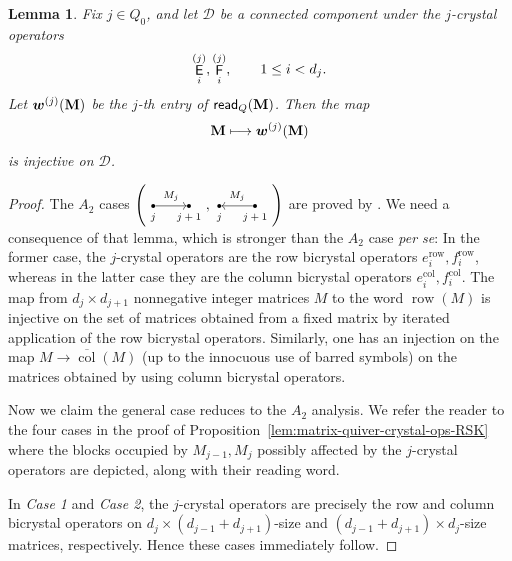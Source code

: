 \documentclass[12pt]{amsart}
\newcommand{\bs}{\boldsymbol}
\DeclareMathOperator{\mate}{\sf E}
\DeclareMathOperator{\matf}{\sf F}
\newtheorem{lemma}[theorem]{Lemma}
\theoremstyle{definition}
\theoremstyle{remark}
\begin{document}
\begin{lemma}\label{lem:single-vertex-injectivity}
Fix $j\in Q_0$, and let $\mathcal D$ be a connected component under
the $j$-crystal operators
\[\mate_i^{(j)},\matf_i^{(j)},\qquad 1\leq i<d_j.\]
Let ${\bs w}^{(j)}({\bf M})$ be the $j$-th entry of
${\sf read}_Q({\bf M})$. Then the map
\[{\bf M}\longmapsto {\bs w}^{(j)}({\bf M})\]
is injective on $\mathcal D$.
\end{lemma}
\begin{proof}
The $A_2$ cases $\left(
\begin{tikzpicture}[baseline=-0.5ex]
\node[circle,fill,inner sep=1pt,label=below:{\scriptsize $j$}] (a) at (0,0) {};
\node[circle,fill,inner sep=1pt,label=below:{\scriptsize $j+1$}]   (b) at (.9,0) {};
\draw[->] (a) -- node[above,font=\scriptsize] {$M_{j}$} (b);
\end{tikzpicture},
\begin{tikzpicture}[baseline=-0.5ex]
\node[circle,fill,inner sep=1pt,label=below:{\scriptsize $j$}] (a) at (0,0) {};
\node[circle,fill,inner sep=1pt,label=below:{\scriptsize $j+1$}]   (b) at (.9,0) {};
\draw[<-] (a) -- node[above,font=\scriptsize] {$M_{j}$} (b);
\end{tikzpicture}\right)$ are proved by \cite[Lemma~4.28]{AAA}. We need a consequence of that lemma, which is 
stronger than the $A_2$ case \emph{per se}:
In the former case, the 
$j$-crystal operators are the row bicrystal operators $e_i^{\operatorname{row}}, f_i^{\operatorname{row}}$, whereas in the
latter case they are the column bicrystal operators $e_i^{\operatorname{col}}, f_i^{\operatorname{col}}$. The
map from $d_j\times d_{j+1}$ nonnegative integer matrices $M$ to the word $\operatorname{row}(M)$
is injective on the set of matrices obtained from a fixed matrix by iterated application of the row bicrystal operators. Similarly, one has an 
injection on the map $M\to \overline{\operatorname{col}}(M)$ (up to the innocuous use of barred symbols) on the matrices obtained by using column bicrystal operators.

Now we claim the general case reduces to the $A_2$ analysis. We refer the reader to the four cases in the proof of Proposition~\ref{lem:matrix-quiver-crystal-ops-RSK} where the blocks occupied by $M_{j-1},M_j$ possibly affected by the $j$-crystal operators are depicted, along with their reading word. 

In \emph{Case 1} and \emph{Case 2}, 
the $j$-crystal operators are precisely the row and column bicrystal operators on $d_{j}\times (d_{j-1}+d_{j+1})$-size
and $(d_{j-1}+d_{j+1})\times d_{j}$-size matrices, respectively. Hence these cases immediately follow.


\end{proof}
\end{document}
